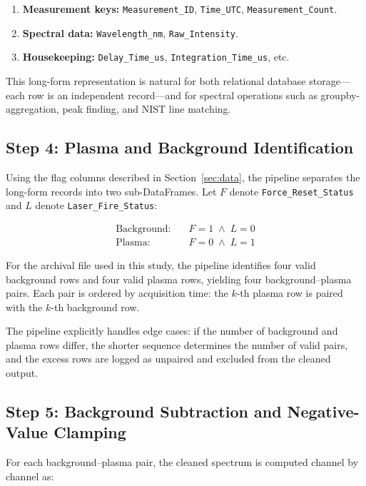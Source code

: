 \documentclass[a4paper,twocolumn,10pt]{article}
\begin{document}
\begin{enumerate}[nosep,leftmargin=*]
  \item \textbf{Measurement keys:} \texttt{Measurement\_ID},
    \texttt{Time\_UTC}, \texttt{Measurement\_Count}.
  \item \textbf{Spectral data:} \texttt{Wavelength\_nm},
    \texttt{Raw\_Intensity}.
  \item \textbf{Housekeeping:} \texttt{Delay\_Time\_us},
    \texttt{Integration\_Time\_us}, etc.
\end{enumerate}

This long-form representation is natural for both relational database
storage---each row is an independent record---and for spectral
operations such as groupby-aggregation, peak finding, and NIST line
matching.

\subsection{Step 4: Plasma and Background Identification}

Using the flag columns described in Section~\ref{sec:data}, the
pipeline separates the long-form records into two sub-DataFrames.
Let $F$ denote \texttt{Force\_Reset\_Status} and $L$ denote
\texttt{Laser\_Fire\_Status}:

\begin{align}
\label{eq:bg_mask}
\text{Background:}\quad & F = 1 \;\wedge\; L = 0 \\
\label{eq:plasma_mask}
\text{Plasma:}\quad & F = 0 \;\wedge\; L = 1
\end{align}

For the archival file used in this study, the pipeline identifies
four valid background rows and four valid plasma rows, yielding four
background--plasma pairs.  Each pair is ordered by acquisition time:
the $k$-th plasma row is paired with the $k$-th background row.

The pipeline explicitly handles edge cases: if the number of
background and plasma rows differ, the shorter sequence determines the
number of valid pairs, and the excess rows are logged as unpaired and
excluded from the cleaned output.

\subsection{Step 5: Background Subtraction and Negative-Value Clamping}

For each background--plasma pair, the cleaned spectrum is computed
channel by channel as:
\end{document}

